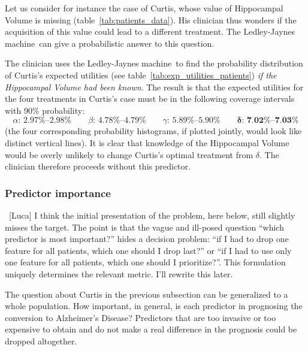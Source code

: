 \documentclass[utf8]{FrontiersinHarvard} %
\newcommand*{\wrench}{{\fontencoding{U}\fontfamily{fontawesomethree}\selectfont\symbol{114}}}
\newcommand{\mynotew}[1]{{\color{notecolour}\wrench\ #1}}
\renewcommand*{\|}[1][]{\nonscript\:#1\vert\nonscript\:\mathopen{}}
\newcommand*{\ad}{Alzheimer's Disease}
\newcommand*{\ljm}{Ledley-Jaynes machine}
\begin{document}
Let us consider for instance the case of Curtis, whose value of Hippocampal Volume is missing (table~\ref{tab:patients_data}). His clinician thus wonders if the acquisition of this value could lead to a different treatment. The \ljm\ can give a probabilistic answer to this question.

The clinician uses the \ljm\ to find the probability distribution of Curtis's expected utilities (see table~\ref{tab:exp_utilities_patients}) \emph{if the Hippocampal Volume had been known}. The result is that the expected utilities for the four treatments in Curtis's case must be in the following coverage intervals with 90\% probability:
\begin{equation}
  \label{eq:possible_utilities_curtis}
  \alpha\text{: 2.97\%--2.98\%}\qquad
  \beta\text{: 4.78\%--4.79\%}\qquad
  \gamma\text{: 5.89\%--5.90\%}\qquad
  \bm{\delta}\textbf{: 7.02\%--7.03\%}
\end{equation}
(the four corresponding probability histograms, if plotted jointly, would look like distinct vertical lines). It is clear that knowledge of the Hippocampal Volume would be overly unlikely to change Curtis's optimal treatment from $\delta$. The clinician therefore proceeds without this predictor.


\subsubsection{Predictor importance}
\label{sec:predictor_importance}

\mynotew{[Luca] I think the initial presentation of the problem, here below, still slightly misses the target. The point is that the vague and ill-posed question \enquote{which predictor is most important?} hides a decision problem: \enquote{if I had to drop one feature for all patients, which one should I drop last?} or \enquote{if I had to use only one feature for all patients, which one should I prioritize?}. This formulation uniquely determines the relevant metric. I'll rewrite this later.}

The question about Curtis in the previous subsection can be generalized to a whole population. How important, in general, is each predictor in prognosing the conversion to \ad? Predictors that are too invasive or too expensive to obtain and do not make a real difference in the prognosis could be dropped altogether.
\end{document}

